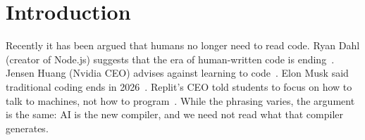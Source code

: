 \documentclass[AMA,STIX2COL]{WileyNJDv5}
\begin{document}


\maketitle
\section{Introduction}
\label{sec:intro}

Recently it has been argued that humans no longer need to read
code. Ryan Dahl (creator of Node.js) suggests that the era of
human-written code is ending~\cite{dahl2024}. Jensen Huang
(Nvidia CEO) advises against learning to code~\cite{huang2024}.
Elon Musk said traditional coding ends in 2026~\cite{musk2026}.
Replit's CEO told students to focus on how to talk to machines,
not how to program~\cite{masad2025}. While the phrasing varies,
the argument is the same: AI is the new compiler, and we need not
read what that compiler generates.
\end{document}
